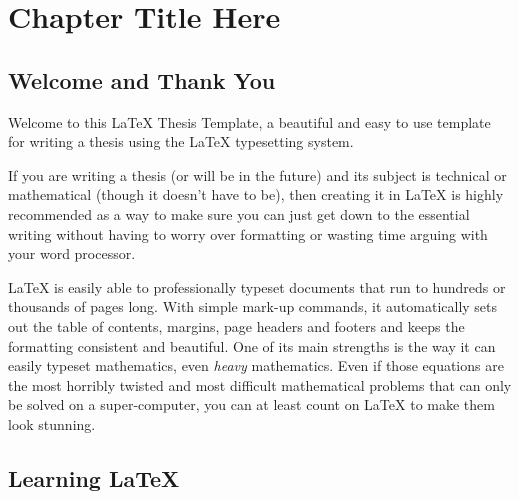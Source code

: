 
\chapter{Chapter Title Here} %

\label{Chapter1} %


\newcommand{\keyword}[1]{\textbf{#1}}
\newcommand{\tabhead}[1]{\textbf{#1}}
\newcommand{\code}[1]{\texttt{#1}}
\newcommand{\file}[1]{\texttt{\bfseries#1}}
\newcommand{\option}[1]{\texttt{\itshape#1}}


\section{Welcome and Thank You}
Welcome to this \LaTeX{} Thesis Template, a beautiful and easy to use template
for writing a thesis using the \LaTeX{} typesetting system.

If you are writing a thesis (or will be in the future) and its subject is
technical or mathematical (though it doesn't have to be), then creating it in
\LaTeX{} is highly recommended as a way to make sure you can just get down to
the essential writing without having to worry over formatting or wasting time
arguing with your word processor.

\LaTeX{} is easily able to professionally typeset documents that run to hundreds or thousands of pages long. With simple mark-up commands, it automatically sets out the table of contents, margins, page headers and footers and keeps the formatting consistent and beautiful. One of its main strengths is the way it can easily typeset mathematics, even \emph{heavy} mathematics. Even if those equations are the most horribly twisted and most difficult mathematical problems that can only be solved on a super-computer, you can at least count on \LaTeX{} to make them look stunning.


\section{Learning \LaTeX{}}


